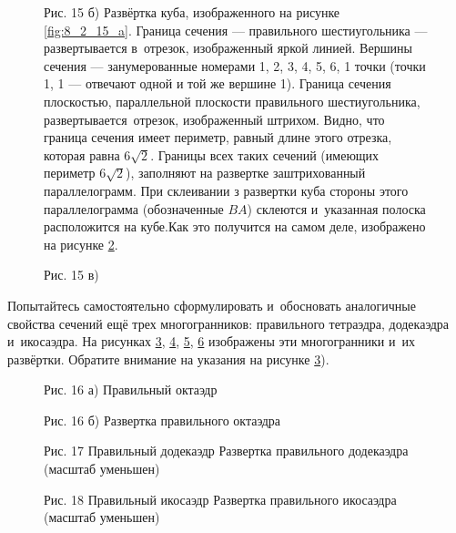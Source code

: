 
\begin{figure}\label{fig:8_2_15_b}

\caption{Рис. 15 б) Развёртка куба, изображенного на рисунке \ref{fig:8_2_15_a}.
Граница сечения --- правильного шестиугольника --- развертывается в~отрезок,
изображенный яркой линией. Вершины сечения --- занумерованные номерами
1, 2, 3, 4, 5, 6, 1 точки (точки 1, 1 --- отвечают одной и той же вершине 1).
Граница сечения плоскостью, параллельной плоскости правильного шестиугольника,
развертывается~отрезок, изображенный штрихом. Видно, что граница сечения
имеет периметр, равный длине этого отрезка, которая равна $6\sqrt{2}$.
Границы всех таких сечений (имеющих периметр $6\sqrt{2}$), заполняют на
развертке заштрихованный параллелограмм. При склеивании з развертки куба
стороны этого параллелограмма (обозначенные $BA$) склеются и~указанная
полоска расположится на кубе.Как это получится на самом деле,
изображено на рисунке \ref{fig:8_2_15_c}.}
\end{figure}


\begin{figure}\label{fig:8_2_15_c}
\caption{Рис. 15 в)}
\end{figure}

Попытайтесь самостоятельно сформулировать и~обосновать аналогичные свойства
сечений ещё трех многогранников: правильного тетраэдра, додекаэдра и~икосаэдра.
На рисунках \ref{fig:8_2_16_a}, \ref{fig:8_2_16_b},
\ref{fig:8_2_17},
\ref{fig:8_2_18}
изображены эти многогранники и~их развёртки. Обратите внимание на указания
на рисунке \ref{fig:8_2_16_a}).

\begin{figure}\label{fig:8_2_16_a}
\caption{Рис. 16 а) Правильный октаэдр}
\end{figure}

\begin{figure}\label{fig:8_2_16_b}
\caption{Рис. 16 б) Развертка правильного октаэдра}
\end{figure}


\begin{figure}\label{fig:8_2_17}
\caption{Рис. 17 Правильный додекаэдр Развертка правильного додекаэдра
(масштаб уменьшен)}
\end{figure}

\begin{figure}\label{fig:8_2_18}
\caption{Рис. 18 Правильный икосаэдр Развертка правильного икосаэдра
(масштаб уменьшен)}
\end{figure}

